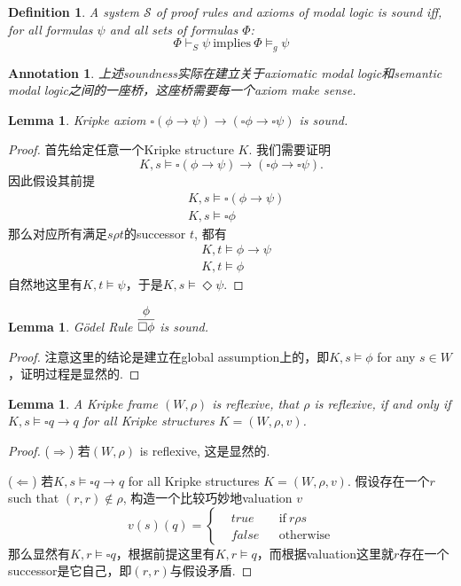 \documentclass{article}
\theoremstyle{plain}
\newtheorem{lemma}[theorem]{Lemma}
\newtheorem{definition}[theorem]{Definition}
\newtheorem{annotation}[theorem]{Annotation}
\theoremstyle{nonumberplain}
\newtheorem{proof}{Proof}
\begin{document}
\begin{definition}
\rm A system $\mathcal{S}$ of proof rules and axioms of modal logic is sound iff, for all formulas $\psi$ and all sets of formulas $\Phi$:
$$
\Phi \vdash_S \psi~\text{implies}~\Phi \vDash_g \psi
$$
\end{definition}


\begin{annotation}
\rm 上述soundness实际在建立关于axiomatic modal logic和semantic modal logic之间的一座桥，这座桥需要每一个axiom make sense. 
\end{annotation}

\begin{lemma}
\rm Kripke axiom $\square(\phi \to \psi) \to (\square\phi \to \square\psi)$ is sound.
\end{lemma}

\begin{proof}
\rm 首先给定任意一个Kripke structure $K$. 我们需要证明
$$
K,s \vDash \square(\phi \to \psi) \to (\square\phi \to \square\psi).
$$
因此假设其前提
$$
\begin{aligned}
&K,s \vDash \square(\phi \to \psi) \\
&K,s \vDash \square\phi
\end{aligned}
$$
那么对应所有满足$s \rho t$的successor $t$, 都有
$$
\begin{aligned}
&K,t \vDash \phi \to \psi \\
&K,t \vDash \phi
\end{aligned}
$$
自然地这里有$K,t \vDash \psi$，于是$K,s \vDash \Diamond \psi$. 
\end{proof}

\begin{lemma}
\rm G\"{o}del Rule $\infer{\square\phi}{\phi}$ is sound.
\end{lemma}

\begin{proof}
注意这里的结论是建立在global assumption上的，即$K,s \vDash \phi$ for any $s \in W$，证明过程是显然的.
\end{proof}

\begin{lemma}
\rm A Kripke frame $(W,\rho)$ is reflexive, that $\rho$ is reflexive, if and only if $K,s \vDash \square q \to q$ for all Kripke structures $K = (W,\rho,v)$. 
\end{lemma}

\begin{proof}
($\Rightarrow$) 若$(W,\rho)$ is reflexive, 这是显然的.

($\Leftarrow$) 若$K,s \vDash \square q \to q$ for all Kripke structures $K = (W,\rho,v)$. 假设存在一个$r$ such that $(r,r) \notin \rho$, 构造一个比较巧妙地valuation $v$
$$
v(s)(q) = \left\{
\begin{aligned}
&true && \text{if}~r \rho s \\
&false && \text{otherwise}
\end{aligned}
\right.
$$
那么显然有$K,r \vDash \square q$，根据前提这里有$K,r \vDash q$，而根据valuation这里就$r$存在一个successor是它自己，即$(r,r)$与假设矛盾. 
\end{proof}
\end{document}
